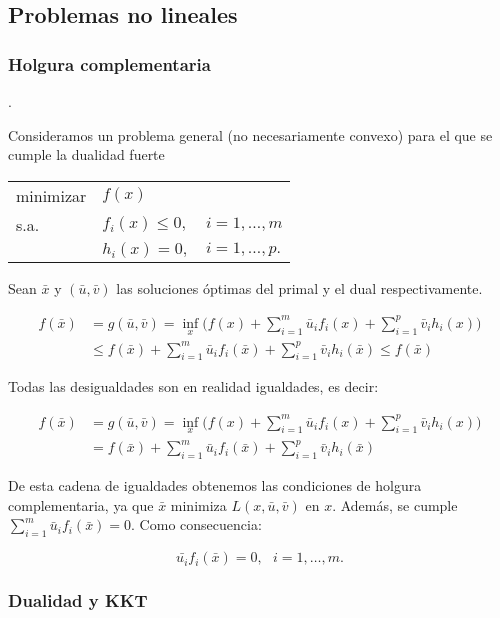 \subsection{Problemas no lineales}

\subsubsection{Holgura complementaria}.

Consideramos un problema general (no necesariamente convexo) para el que se cumple la dualidad fuerte

\begin{center}
\begin{tabular}{lll}
minimizar & $f(x)$ \\
s.a. & $f_i(x)\leq 0,$  &  $i=1,\ldots,m$ \\
	 & $h_i(x) = 0,$  &  $i=1,\ldots,p.$
\end{tabular}
\end{center}

Sean $\bar{x}$ y $(\bar{u},\bar{v})$ las soluciones óptimas del primal y el dual respectivamente.

\begin{align*}
f(\bar{x}) &= g(\bar{u},\bar{v}) = \inf_x \big(f(x) + \sum_{i=1}^m \bar{u}_i f_i(x) + \sum_{i=1}^p \bar{v}_i h_i(x) \big)\\
&\leq f(\bar{x}) + \sum_{i=1}^m \bar{u}_i f_i(\bar{x}) + \sum_{i=1}^p \bar{v}_i h_i(\bar{x}) \leq f(\bar{x})
\end{align*}


Todas las desigualdades son en realidad igualdades, es decir:

\begin{align*}
f(\bar{x}) &= g(\bar{u},\bar{v}) = \inf_x \big(f(x) + \sum_{i=1}^m \bar{u}_i f_i(x) + \sum_{i=1}^p \bar{v}_i h_i(x) \big)\\
&= f(\bar{x}) + \sum_{i=1}^m \bar{u}_i f_i(\bar{x}) + \sum_{i=1}^p \bar{v}_i h_i(\bar{x}) 
\end{align*}

De esta cadena de igualdades obtenemos las condiciones de holgura complementaria, ya que $\bar{x}$ minimiza $L(x,\bar{u},\bar{v})$ en $x$.
%
Además, se cumple $\sum_{i=1}^m \bar{u}_i f_i(\bar{x})=0$.
%
Como consecuencia:

	\[
		\bar{u_i} f_i(\bar{x}) = 0, \ \ \ i=1,\ldots,m.
	\]


\subsubsection{Dualidad y KKT}

